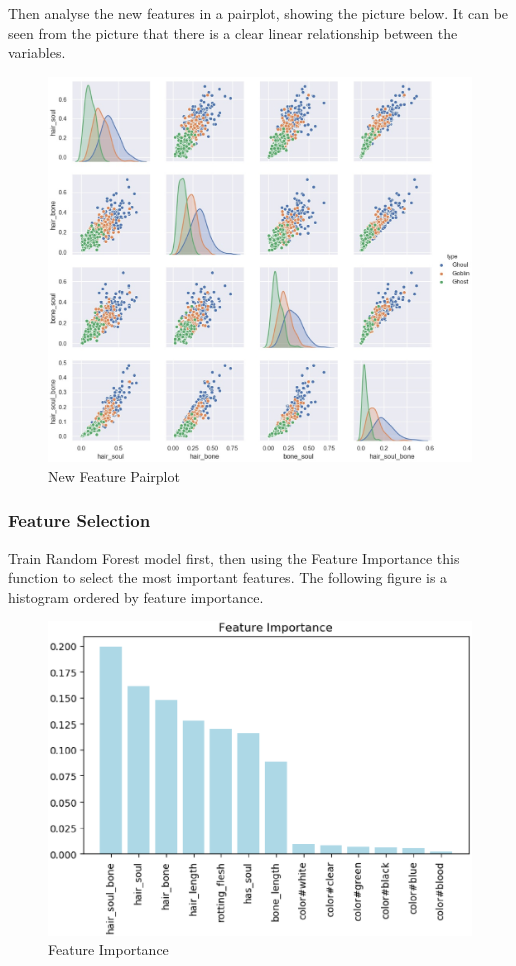 Then analyse the new features in a pairplot, showing the picture below. It can be seen from the picture that there is a clear linear relationship between the variables. 


\begin{figure}[h]\centering
	\includegraphics[scale=0.3]{figures/hist_1.eps}
	\caption{New Feature Pairplot}
\end{figure}

\subsubsection{Feature Selection}
Train Random Forest model first, then using the Feature Importance this function to select the most important features. The following figure is a histogram ordered by feature importance. 


\begin{figure}[h]\centering
	\includegraphics[scale=0.3]{figures/FEATURE.eps}
	\caption{Feature Importance}
\end{figure}


